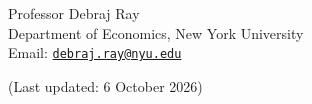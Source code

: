 \documentclass[11pt]{article}
\newlength{\oneli}
\begin{document}
\fi

Professor {Debraj Ray}\\
Department of Economics, New York University\\
Email: \href{mailto:debraj.ray@nyu.edu}{\texttt{debraj.ray@nyu.edu}}


\vspace{\oneli}
\vfill

{\small (Last updated: 6 October 2026)}
\end{document}
